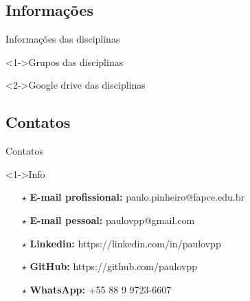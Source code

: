 \documentclass{beamer}
\begin{document}
\subsection{Informações}
\begin{frame}{Informações das disciplinas}
    \begin{block}<1->{Grupos das disciplinas}
        
    \end{block}
    \vspace{0.2cm}
    \begin{block}<2->{Google drive das disciplinas}
        
    \end{block}
\end{frame}
%
\subsection{Contatos}
\begin{frame}{Contatos}
    \begin{block}<1->{Info}
        \begin{itemize}
            \item [$\star$] \textbf{E-mail profissional:} paulo.pinheiro@fapce.edu.br\\
            \item [$\star$] \textbf{E-mail pessoal:} paulovpp@gmail.com\\
            \item [$\star$] \textbf{Linkedin:} https://linkedin.com/in/paulovpp\\
            \item [$\star$] \textbf{GitHub:} https://github.com/paulovpp\\
            \item [$\star$] \textbf{WhatsApp:} +55 88 9 9723-6607
        \end{itemize}
    \end{block}
\end{frame}



\end{document}
